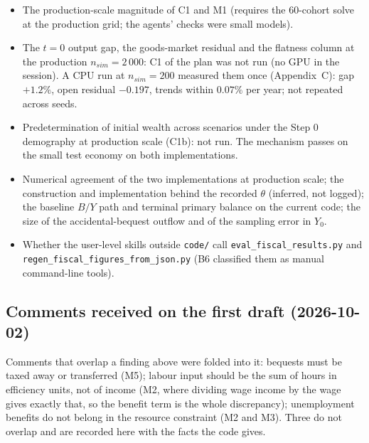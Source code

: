 \documentclass[11pt,a4paper]{article}
\newcommand{\code}[1]{\texttt{#1}}
\begin{document}
\begin{itemize}
\item The production-scale magnitude of C1 and M1 (requires the 60-cohort solve at the production grid; the agents' checks were small models).
\item The $t = 0$ output gap, the goods-market residual and the flatness column at the production $n_{sim} = 2\,000$: C1 of the plan was not run (no GPU in the session). A CPU run at $n_{sim} = 200$ measured them once (Appendix~C): gap $+1.2\%$, open residual $-0.197$, trends within $0.07\%$ per year; not repeated across seeds.
\item Predetermination of initial wealth across scenarios under the Step 0 demography at production scale (C1b): not run. The mechanism passes on the small test economy on both implementations.
\item Numerical agreement of the two implementations at production scale; the construction and implementation behind the recorded $\theta$ (inferred, not logged); the baseline $B/Y$ path and terminal primary balance on the current code; the size of the accidental-bequest outflow and of the sampling error in $Y_0$.
\item Whether the user-level skills outside \code{code/} call \code{eval_fiscal_results.py} and \code{regen_fiscal_figures_from_json.py} (B6 classified them as manual command-line tools).
\end{itemize}

\subsection{Comments received on the first draft (2026-10-02)}\label{sec:comments}

Comments that overlap a finding above were folded into it: bequests must be taxed away or transferred (M5); labour input should be the sum of hours in efficiency units, not of income (M2, where dividing wage income by the wage gives exactly that, so the benefit term is the whole discrepancy); unemployment benefits do not belong in the resource constraint (M2 and M3). Three do not overlap and are recorded here with the facts the code gives.
\end{document}
